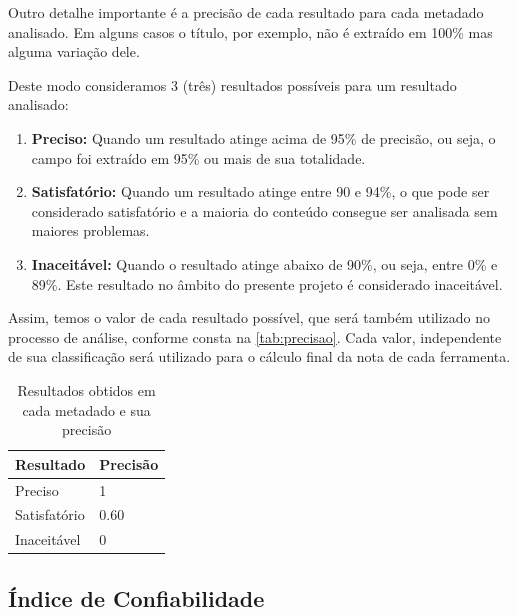 
Outro detalhe importante é a precisão de cada resultado para cada metadado analisado. Em alguns casos o título, por exemplo, não é extraído em 100\% mas alguma variação dele. 

Deste modo consideramos 3 (três) resultados possíveis para um resultado analisado:

\begin{enumerate}
\item \textbf{Preciso:} Quando um resultado atinge acima de 95\% de precisão, ou seja, o campo foi extraído em 95\% ou mais de sua totalidade.
\item \textbf{Satisfatório:} Quando um resultado atinge entre 90 e 94\%, o que pode ser considerado satisfatório e a maioria do conteúdo consegue ser analisada sem maiores problemas.
\item \textbf{Inaceitável:} Quando o resultado atinge abaixo de 90\%, ou seja, entre 0\% e 89\%. Este resultado no âmbito do presente projeto é considerado inaceitável.
\end{enumerate}

Assim, temos o valor de cada resultado possível, que será também utilizado no processo de análise, conforme consta na \autoref{tab:precisao}. Cada valor, independente de sua classificação será utilizado para o cálculo final da nota de cada ferramenta.


\begin{table}
    \caption{Resultados obtidos em cada metadado e sua precisão}
    \begin{center}
    	\begin{tabular}{|C{3cm}|C{3cm}|}
			\hline \textbf{Resultado} & \textbf{Precisão} \\ 
			\hline Preciso & 1\\
	    	\hline Satisfatório & 0.60 \\
	    	\hline Inaceitável & 0 \\
	    	\hline 
    	\end{tabular} 
    \end{center}
  	\label{tab:precisao}
\end{table}

\subsection{Índice de Confiabilidade}

